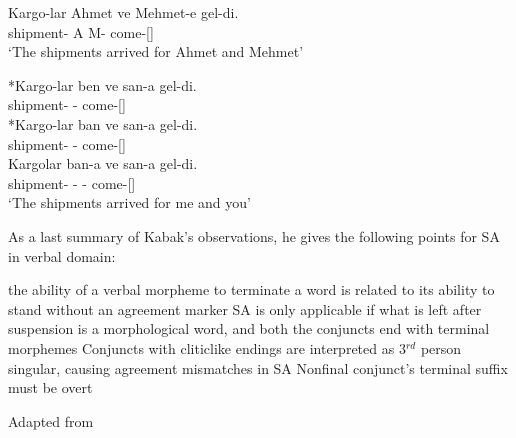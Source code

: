 \begin{exe}
\ex \label{kabakphonology}
\begin{xlist}
\ex \gll 
Kargo-lar Ahmet ve Mehmet-e gel-di. \\ shipment-{\Pl} A {\And} M-{\Dat} come-{\Pst}[{\Tsg}] \\
\glt `The shipments arrived for Ahmet and Mehmet'

\ex \gll 
*Kargo-lar ben ve san-a gel-di. \\ shipment-{\Pl} {\Fsg} {\And} {\Ssg}-{\Dat} come-{\Pst}[{\Tsg}] \\

\ex \gll 
*Kargo-lar ban ve san-a gel-di. \\ shipment-{\Pl} {\Fsg} {\And} {\Ssg}-{\Dat} come-{\Pst}[{\Tsg}] \\


\ex \gll 
Kargolar ban-a ve san-a gel-di. \\ shipment-{\Pl} {\Fsg}-{\Dat} {\And} {\Ssg}-{\Dat} come-{\Pst}[{\Tsg}] \\
\glt `The shipments arrived for me and you'


\end{xlist}
\end{exe}


As a last summary of Kabak's observations, he gives the following points for SA in verbal domain:
\begin{exe}
\sn \begin{xlisti}
    \ex the ability of a verbal morpheme to terminate a word is related to its ability to stand without an agreement marker
    \ex SA is only applicable if what is left after suspension is a morphological word, and both the conjuncts end with terminal morphemes
    \ex Conjuncts with cliticlike endings are interpreted as 3$^{rd}$ person singular, causing agreement mismatches in SA
    \ex Nonfinal conjunct's terminal suffix must be overt
    \end{xlisti}
    \hfill Adapted from \cite{kabak2007turkish}
\end{exe}

